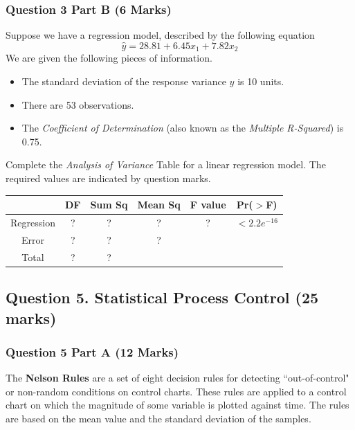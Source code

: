 \documentclass[a4paper,12pt]{article}
\begin{document}
\subsubsection*{Question 3 Part B (6 Marks)}
Suppose we have a regression model, described by the following equation
\[ \hat{y} = 28.81 + 6.45x_1 + 7.82 x_2\]
We are given the following pieces of information.
\begin{itemize}
	\item The standard deviation of the response variance $y$ is 10 units.
	\item There are 53 observations.
	\item The \textit{Coefficient of Determination} (also known as the \textit{Multiple R-Squared}) is 0.75.
\end{itemize}
Complete the \textit{Analysis of Variance} Table for a linear regression model.
The required values are indicated by question marks.

\begin{center}
	\begin{tabular}{|c|c|c|c|c|c|} \hline
	\phantom{makespace}	& DF & 	Sum Sq &	Mean Sq &	F value &   	Pr($>$F)    \\ \hline
		Regression &  \phantom{make}?\phantom{make} &	? &	? &	 ? &	$< 2.2e^{-16}$ \\ \hline
		Error  & ? &	? &  	?   &            &       \\ \hline
		Total  & ?  &	? &  \phantom{makespace}	  &   \phantom{makespace}         &    \phantom{makespace}    \\ \hline
	\end{tabular} 
\end{center}


\newpage


\subsection*{Question 5. Statistical Process Control (25 marks) }

\subsubsection*{Question 5 Part A (12 Marks)}
The \textbf{Nelson Rules} are a set of eight decision rules for detecting ``out-of-control" or non-random conditions on control charts. These rules are applied to a control chart on which the magnitude of some variable is plotted against time. The rules are based on the mean value and the standard deviation of the samples.\\
\end{document}
